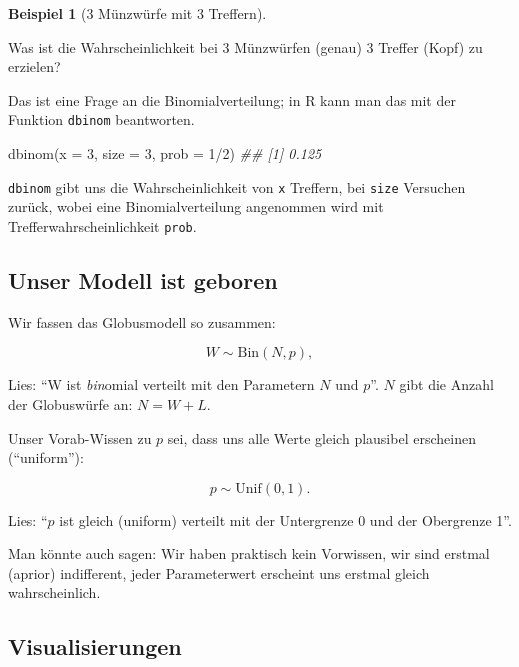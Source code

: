 \documentclass[
  a4paper,
  DIV=11]{scrreprt}
\newenvironment{Shaded}{\begin{snugshade}}{\end{snugshade}}
\newcommand{\AttributeTok}[1]{\textcolor[rgb]{0.40,0.45,0.13}{#1}}
\newcommand{\DecValTok}[1]{\textcolor[rgb]{0.68,0.00,0.00}{#1}}
\newcommand{\DocumentationTok}[1]{\textcolor[rgb]{0.37,0.37,0.37}{\textit{#1}}}
\newcommand{\FunctionTok}[1]{\textcolor[rgb]{0.28,0.35,0.67}{#1}}
\newcommand{\NormalTok}[1]{\textcolor[rgb]{0.00,0.23,0.31}{#1}}
\newcommand{\SpecialCharTok}[1]{\textcolor[rgb]{0.37,0.37,0.37}{#1}}
\theoremstyle{definition}
\newtheorem{example}{Beispiel}[chapter]
\theoremstyle{remark}
\begin{document}
\leavevmode{}%
\begin{example}[3 Münzwürfe mit 3 Treffern]\label{exm-globus4}

Was ist die Wahrscheinlichkeit bei 3 Münzwürfen (genau) 3 Treffer (Kopf)
zu erzielen?

Das ist eine Frage an die Binomialverteilung; in R kann man das mit der
Funktion \texttt{dbinom} beantworten.

\begin{Shaded}
\begin{Highlighting}[]
\FunctionTok{dbinom}\NormalTok{(}\AttributeTok{x =} \DecValTok{3}\NormalTok{, }\AttributeTok{size =} \DecValTok{3}\NormalTok{, }\AttributeTok{prob =} \DecValTok{1}\SpecialCharTok{/}\DecValTok{2}\NormalTok{)}
\DocumentationTok{\#\# [1] 0.125}
\end{Highlighting}
\end{Shaded}

\end{example}

\texttt{dbinom} gibt uns die Wahrscheinlichkeit von \texttt{x} Treffern,
bei \texttt{size} Versuchen zurück, wobei eine Binomialverteilung
angenommen wird mit Trefferwahrscheinlichkeit \texttt{prob}.

\hypertarget{unser-modell-ist-geboren}{%
\subsection{Unser Modell ist geboren}\label{unser-modell-ist-geboren}}

Wir fassen das Globusmodell so zusammen:

\[W \sim \text{Bin}(N,p),\]

Lies: ``W ist \emph{bin}omial verteilt mit den Parametern \(N\) und
\(p\)''. \(N\) gibt die Anzahl der Globuswürfe an: \(N=W+L\).

Unser Vorab-Wissen zu \(p\) sei, dass uns alle Werte gleich plausibel
erscheinen (``uniform''):

\[p \sim \text{Unif}(0,1).\]

Lies: ``\(p\) ist gleich (uniform) verteilt mit der Untergrenze 0 und
der Obergrenze 1''.

Man könnte auch sagen: Wir haben praktisch kein Vorwissen, wir sind
erstmal (aprior) indifferent, jeder Parameterwert erscheint uns erstmal
gleich wahrscheinlich.

\hypertarget{visualisierungen}{%
\subsection{Visualisierungen}\label{visualisierungen}}
\end{document}
